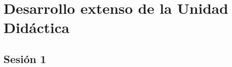 \chapter{Desarrollo extenso de la Unidad Didáctica}


\label{app:todo}







\section{Sesión 1}\label{app:ses_comp:1}


